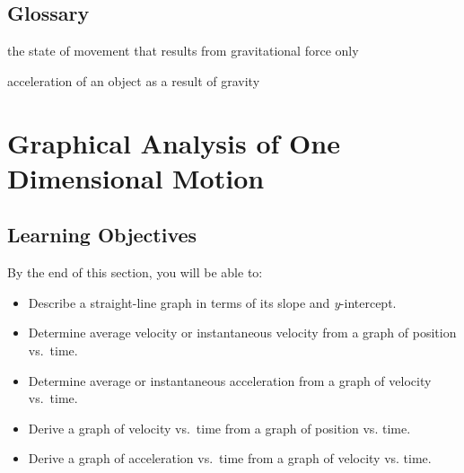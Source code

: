 \documentclass[
]{book}
\providecommand{\tightlist}{%
  \setlength{\itemsep}{0pt}\setlength{\parskip}{0pt}}
\newenvironment{learning-objectives}{}{}
\begin{document}
\hypertarget{glossary-4}{%
\subsection{Glossary}\label{glossary-4}}

\begin{description}
\tightlist
\item[free-fall]
the state of movement that results from gravitational force only
\end{description}

\begin{description}
\tightlist
\item[acceleration due to gravity]
acceleration of an object as a result of gravity
\end{description}

\hypertarget{graphical-analysis-of-one-dimensional-motion}{%
\section{Graphical Analysis of One Dimensional Motion}\label{graphical-analysis-of-one-dimensional-motion}}

\hypertarget{fs-id1367279}{}
\begin{learning-objectives}

\hypertarget{learning-objectives-7}{%
\subsection{Learning Objectives}\label{learning-objectives-7}}

By the end of this section, you will be able to:

\begin{itemize}
\tightlist
\item
  Describe a straight-line graph in terms of its slope and
  \emph{y}-intercept.
\item
  Determine average velocity or instantaneous velocity from a graph of
  position vs.~time.
\item
  Determine average or instantaneous acceleration from a graph of
  velocity vs.~time.
\item
  Derive a graph of velocity vs.~time from a graph of position vs.
  time.
\item
  Derive a graph of acceleration vs.~time from a graph of velocity vs.
  time.
\end{itemize}

\end{learning-objectives}
\end{document}
